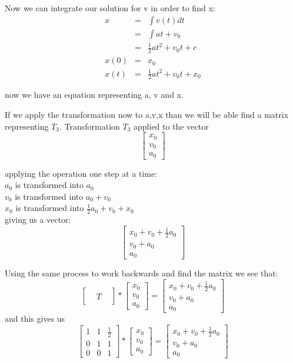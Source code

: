 \documentclass[12pt]{article}
\begin{document}
Now we can integrate our solution for v in order to find x:
\begin{eqnarray*}
x &=& \int v(t) dt\\
&=& \int at + v_{0}\\
&=& \frac{1}{2}at^{2} + v_{0}t + c\\
x(0) &=& x_{0}\\
x(t) &=& \frac{1}{2}at^{2} + v_{0}t + x_{0} 
\end{eqnarray*}

now we have an equation representing a, v and x. 

If we apply the transformation now to a,v,x than we will be able find a matrix representing $T_{3}$. Transformation $T_{3}$ applied to the vector 
\[
\begin{bmatrix}
x_{0}\\
v_{0}\\
a_{0}
\end{bmatrix}
\]

applying the operation one step at a time:\\
$a_{0}$ is transformed into $a_{0}$\\
$v_{0}$ is transformed into $a_{0} + v_{0}$\\
$x_{0}$ is transformed into $\frac{1}{2}a_{0} + v_{0} + x_{0}$\\
giving us a vector:\\
\[
\begin{bmatrix}
x_{0} + v_{0} + \frac{1}{2}a_{0}\\
v_{0} + a_{0}\\
a_{0}
\end{bmatrix}
\]

Using the same process to work backwards and find the matrix we see that:\\

\[
\begin{bmatrix}
& &\\
&T&\\
&&
\end{bmatrix}
*
\begin{bmatrix}
x_{0}\\
v_{0}\\
a_{0}
\end{bmatrix}
=
\begin{bmatrix}
x_{0} + v_{0} + \frac{1}{2}a_{0}\\
v_{0} + a_{0}\\
a_{0}
\end{bmatrix}
\]
and this gives us
\[
\begin{bmatrix}
1 & 1 & \frac{1}{2}\\
0 & 1 & 1\\
0 & 0 & 1
\end{bmatrix}
*
\begin{bmatrix}
x_{0}\\
v_{0}\\
a_{0}
\end{bmatrix}
=
\begin{bmatrix}
x_{0} + v_{0} + \frac{1}{2}a_{0}\\
v_{0} + a_{0}\\
a_{0}
\end{bmatrix}
\]
\end{document}
